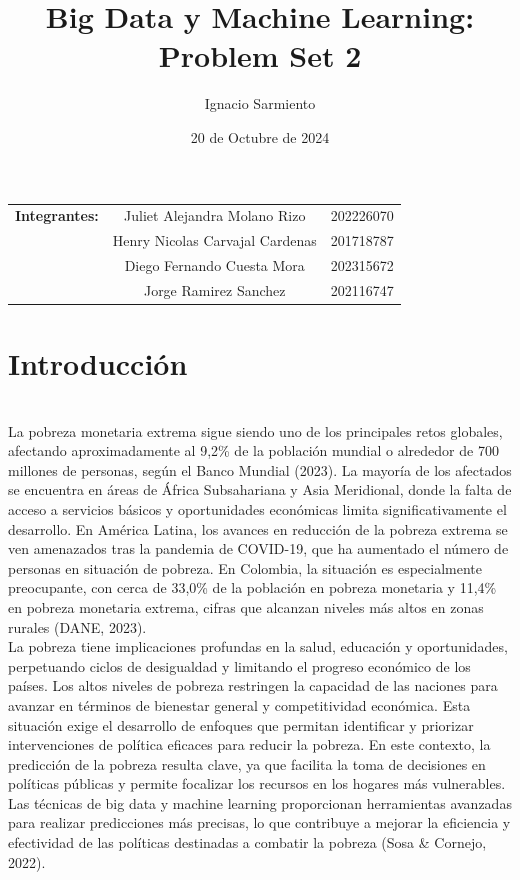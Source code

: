 \documentclass[a4paper]{article}
\title{Big Data y Machine Learning: Problem Set 2}
\author{Ignacio Sarmiento}
\date{20 de Octubre de 2024}
\theoremstyle{remark}
\theoremstyle{definition}
\begin{document}
\maketitle

\begin{center}

\begin{tabular}{ c c c }
 \textbf{Integrantes:} & Juliet Alejandra Molano Rizo & 202226070 \\
 & Henry Nicolas Carvajal Cardenas & 201718787\\
 & Diego Fernando Cuesta Mora & 202315672\\
 & Jorge Ramirez Sanchez & 202116747
\end{tabular}

\end{center}

\section{Introducción} \\

La pobreza monetaria extrema sigue siendo uno de los principales retos globales, afectando aproximadamente al 9,2\% de la población mundial o alrededor de 700 millones de personas, según el Banco Mundial (2023). La mayoría de los afectados se encuentra en áreas de África Subsahariana y Asia Meridional, donde la falta de acceso a servicios básicos y oportunidades económicas limita significativamente el desarrollo. En América Latina, los avances en reducción de la pobreza extrema se ven amenazados tras la pandemia de COVID-19, que ha aumentado el número de personas en situación de pobreza. En Colombia, la situación es especialmente preocupante, con cerca de 33,0\% de la población en pobreza monetaria y 11,4\% en pobreza monetaria extrema, cifras que alcanzan niveles más altos en zonas rurales (DANE, 2023). \\

La pobreza tiene implicaciones profundas en la salud, educación y oportunidades, perpetuando ciclos de desigualdad y limitando el progreso económico de los países. Los altos niveles de pobreza restringen la capacidad de las naciones para avanzar en términos de bienestar general y competitividad económica. Esta situación exige el desarrollo de enfoques que permitan identificar y priorizar intervenciones de política eficaces para reducir la pobreza. En este contexto, la predicción de la pobreza resulta clave, ya que facilita la toma de decisiones en políticas públicas y permite focalizar los recursos en los hogares más vulnerables. Las técnicas de big data y machine learning proporcionan herramientas avanzadas para realizar predicciones más precisas, lo que contribuye a mejorar la eficiencia y efectividad de las políticas destinadas a combatir la pobreza (Sosa \& Cornejo, 2022).\\ 
\end{document}
